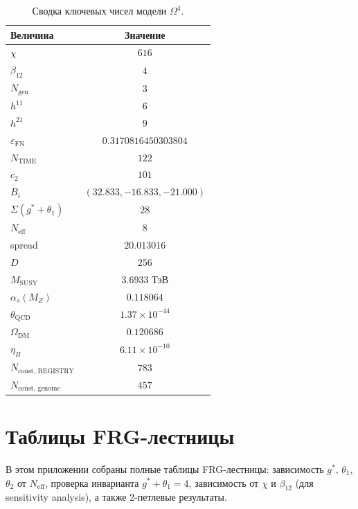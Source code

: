 \documentclass[11pt,a4paper]{article}
\newcommand{\Om}{\ensuremath{\Omega^4}}
\theoremstyle{definition}
\begin{document}
\begin{table}[ht]
\centering
\caption{Сводка ключевых чисел модели \texorpdfstring{$\Om$}{}.}
\label{tab:app-summary-numbers}
\begin{tabular}{lc}
\toprule
Величина & Значение \\
\midrule
$\chi$ & $616$ \\
$\beta_{12}$ & $4$ \\
$N_{\text{gen}}$ & $3$ \\
$h^{11}$ & $6$ \\
$h^{21}$ & $9$ \\
$\varepsilon_{\text{FN}}$ & $0.3170816450303804$ \\
$N_{\text{TIME}}$ & $122$ \\
$c_2$ & $101$ \\
$B_i$ & $(32.833, -16.833, -21.000)$ \\
$\Sigma(g^*+\theta_1)$ & $28$ \\
$N_{\text{eff}}$ & $8$ \\
spread & $20.013016$ \\
$D$ & $256$ \\
$M_{\text{SUSY}}$ & $3.6933$ ТэВ \\
$\alpha_s(M_Z)$ & $0.118064$ \\
$\theta_{\text{QCD}}$ & $1.37 \times 10^{-44}$ \\
$\Omega_{\text{DM}}$ & $0.120686$ \\
$\eta_B$ & $6.11 \times 10^{-10}$ \\
$N_{\text{const, REGISTRY}}$ & $783$ \\
$N_{\text{const, genome}}$ & $457$ \\
\bottomrule
\end{tabular}
\end{table}

\section{Таблицы FRG-лестницы}
\label{app:frg-tables}

В этом приложении собраны полные таблицы FRG-лестницы:
зависимость $g^*$, $\theta_1$, $\theta_2$ от $N_{\text{eff}}$,
проверка инварианта $g^* + \theta_1 = 4$, зависимость от
$\chi$ и $\beta_{12}$ (для sensitivity analysis), а также
2-петлевые результаты.

\end{document}
